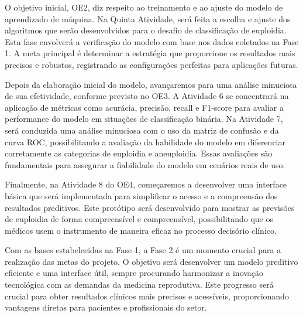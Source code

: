 O objetivo inicial, OE2, diz respeito ao treinamento e ao ajuste do modelo de aprendizado de máquina. Na Quinta Atividade, será feita a escolha e ajuste dos algoritmos que serão desenvolvidos para o desafio de classificação de euploidia. Esta fase envolverá a verificação do modelo com base nos dados coletados na Fase 1. A meta principal é determinar a estratégia que proporcione os resultados mais precisos e robustos, registrando as configurações perfeitas para aplicações futuras.

Depois da elaboração inicial do modelo, avançaremos para uma análise minuciosa de sua efetividade, conforme previsto no OE3. A Atividade 6 se concentrará na aplicação de métricas como acurácia, precisão, recall e F1-score para avaliar a performance do modelo em situações de classificação binária. Na Atividade 7, será conduzida uma análise minuciosa com o uso da matriz de confusão e da curva ROC, possibilitando a avaliação da habilidade do modelo em diferenciar corretamente as categorias de euploidia e aneuploidia. Essas avaliações são fundamentais para assegurar a fiabilidade do modelo em cenários reais de uso.

Finalmente, na Atividade 8 do OE4, começaremos a desenvolver uma interface básica que será implementada para simplificar o acesso e a compreensão dos resultados preditivos. Este protótipo será desenvolvido para mostrar as previsões de euploidia de forma compreensível e compreensível, possibilitando que os médicos usem o instrumento de maneira eficaz no processo decisório clínico. 

Com as bases estabelecidas na Fase 1, a Fase 2 é um momento crucial para a realização das metas do projeto. O objetivo será desenvolver um modelo preditivo eficiente e uma interface útil, sempre procurando harmonizar a inovação tecnológica com as demandas da medicina reprodutiva. Este progresso será crucial para obter resultados clínicos mais precisos e acessíveis, proporcionando vantagens diretas para pacientes e profissionais do setor.